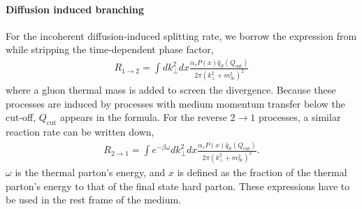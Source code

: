 \paragraph{Diffusion induced branching} For the incoherent diffusion-induced splitting rate, we borrow the expression from \cite{Cao:2017hhk} while stripping the time-dependent phase factor,
\begin{eqnarray}
R_{1\rightarrow 2} = \int d k_\perp^2 dx \frac{\alpha_s P(x) \hat{q}_S(Q_{\textrm{cut}})}{2\pi (k_\perp^2 + m_\infty^2)^2}
\end{eqnarray}
where a gluon thermal mass is added to screen the divergence.
Because these processes are induced by processes with medium momentum transfer below the cut-off, $Q_{\textrm{cut}}$ appears in the formula.
For the reverse $2\rightarrow 1$ processes, a similar reaction rate can be written down,
\begin{eqnarray}
R_{2\rightarrow 1} = \int e^{-\beta \omega} d k_\perp^2 dx \frac{\alpha_s P(x) \hat{q}_S(Q_{\textrm{cut}})}{2\pi (k_\perp^2 + m_\infty^2)^2}.
\end{eqnarray}
$\omega$ is the thermal parton's energy, and $x$ is defined as the fraction of the thermal parton's energy to that of the final state hard parton.
These expressions have to be used in the rest frame of the medium.


